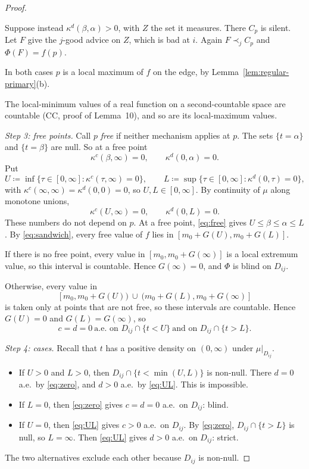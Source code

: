 \documentclass[11pt]{article}
\theoremstyle{remark}\newtheorem{remark}[theorem]{Remark}
\begin{document}
\begin{proof}
\begin{itemize}[leftmargin=*,itemsep=2pt]
Suppose instead $\kappa^d(\beta,\alpha)>0$, with $Z$ the set it measures.
There $C_p$ is silent. Let $F$ give the $j$-good advice on $Z$, which is bad
at $i$. Again $F\prec_jC_p$ and $\Phi(F)=f(p)$.

In both cases $p$ is a local maximum of $f$ on the edge, by
Lemma~\ref{lem:regular-primary}(b).
\end{itemize}
The local-minimum values of a real function on a second-countable space are
countable (CC, proof of Lemma~10), and so are its local-maximum values.

\emph{Step 3: free points.} Call $p$ \emph{free} if neither mechanism applies
at $p$. The sets $\{t=\alpha\}$ and $\{t=\beta\}$ are null. So at a free
point
\begin{equation}
 \kappa^c(\beta,\infty)=0,\qquad \kappa^d(0,\alpha)=0.
 \label{eq:free}
\end{equation}
Put
\[
 U\coloneqq\inf\{\tau\in[0,\infty]:\kappa^c(\tau,\infty)=0\},\qquad
 L\coloneqq\sup\{\tau\in[0,\infty]:\kappa^d(0,\tau)=0\},
\]
with $\kappa^c(\infty,\infty)=\kappa^d(0,0)=0$, so $U,L\in[0,\infty]$.
By continuity of $\mu$ along monotone unions,
\begin{equation}
 \kappa^c(U,\infty)=0,\qquad \kappa^d(0,L)=0.
 \label{eq:UL}
\end{equation}
These numbers do not depend on $p$. At a free point, \eqref{eq:free} gives
$U\le\beta\le\alpha\le L$. By \eqref{eq:sandwich}, every free value of $f$
lies in $[m_0+G(U),m_0+G(L)]$.

If there is no free point, every value in $[m_0,m_0+G(\infty)]$ is a local
extremum value, so this interval is countable. Hence $G(\infty)=0$, and $\Phi$
is blind on $D_{ij}$.

Otherwise, every value in
\[
 [m_0,m_0+G(U))\ \cup\ (m_0+G(L),m_0+G(\infty)]
\]
is taken only at points that are not free, so these intervals are countable.
Hence $G(U)=0$ and $G(L)=G(\infty)$, so
\begin{equation}
 c=d=0\ \text{a.e.\ on }D_{ij}\cap\{t<U\}\ \text{and on }D_{ij}\cap\{t>L\}.
 \label{eq:zero}
\end{equation}

\emph{Step 4: cases.} Recall that $t$ has a positive density on $(0,\infty)$
under $\mu|_{D_{ij}}$.
\begin{itemize}[leftmargin=*,itemsep=2pt]
\item If $U>0$ and $L>0$, then $D_{ij}\cap\{t<\min(U,L)\}$ is non-null. There
$d=0$ a.e.\ by \eqref{eq:zero}, and $d>0$ a.e.\ by \eqref{eq:UL}. This is
impossible.
\item If $L=0$, then \eqref{eq:zero} gives $c=d=0$ a.e.\ on $D_{ij}$: blind.
\item If $U=0$, then \eqref{eq:UL} gives $c>0$ a.e.\ on $D_{ij}$. By
\eqref{eq:zero}, $D_{ij}\cap\{t>L\}$ is null, so $L=\infty$. Then
\eqref{eq:UL} gives $d>0$ a.e.\ on $D_{ij}$: strict.
\end{itemize}
The two alternatives exclude each other because $D_{ij}$ is non-null.


\end{proof}
\end{document}
